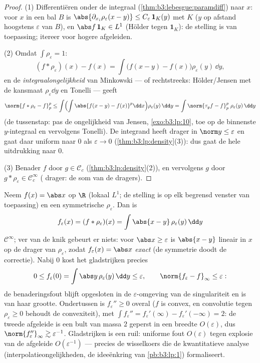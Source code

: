 \begin{proof}
(1) Differentiëren onder de integraal
(\cref{thm:b3:lebesgue:paramdiff}) naar $x$: voor $x$ in een bal
$B$ is $\abs{\partial_{x_i}\rho_\varepsilon(x - y)} \leq
C_\varepsilon\,\mathbf 1_{K}(y)$ met $K$  ($y$ op afstand
hoogstens $\varepsilon$ van $B$), en $\abs f\,\mathbf 1_K \in
L^1$ (Hölder tegen $\mathbf 1_K$): de stelling is van
toepassing; itereer voor hogere afgeleiden.

(2) Omdat $\int\rho_\varepsilon = 1$:
\[
(f * \rho_\varepsilon)(x) - f(x)
= \int \bigl(f(x - y) - f(x)\bigr)\rho_\varepsilon(y)\,\dd y ,
\]
en de \emph{integraalongelijkheid} van Minkowski --- of
rechtstreeks: Hölder/Jensen met de kansmaat
$\rho_\varepsilon\dd y$ en Tonelli --- geeft
\[
\norm{f*\rho_\varepsilon - f}_p^p
\leq \int\Bigl(\int\abs{f(x-y) -
f(x)}^p\dd x\Bigr)\rho_\varepsilon(y)\,\dd y
= \int \norm{\tau_yf - f}_p^p\;\rho_\varepsilon(y)\,\dd y
\]
(de tussenstap: pas de ongelijkheid van Jensen,
\cref{exo:b3:lp:10}, toe op de binnenste $y$-integraal en
vervolgens Tonelli). De integrand heeft drager in $\norm y \leq
\varepsilon$ en gaat daar uniform naar $0$ als $\varepsilon \to
0$ (\cref{thm:b3:lp:density}(3)): dus gaat de hele uitdrukking
naar $0$.

(3) Benader $f$ door $g \in \mathcal C_c$
(\cref{thm:b3:lp:density}(2)), en vervolgens $g$ door $g *
\rho_\varepsilon \in \mathcal C_c^\infty$ ( drager: de
som van de dragers).
\end{proof}

\begin{example}
\label{ex:b3:lp:mollifyexample}
Neem $f(x) = \abs x$ op $\R$ (lokaal $L^1$; de stelling is op elk
begrensd venster van toepassing) en een symmetrische 
$\rho_\varepsilon$. Dan is
\[
f_\varepsilon(x) = (f * \rho_\varepsilon)(x)
= \int\abs{x - y}\,\rho_\varepsilon(y)\,\dd y
\]
$\mathcal C^\infty$; ver van de knik gebeurt er niets: voor
$\abs x \geq \varepsilon$ is $\abs{x - y}$ lineair in $x$ op de
drager van $\rho_\varepsilon$, zodat $f_\varepsilon(x) = \abs x$
\emph{exact} (de symmetrie doodt de correctie). Nabij $0$ kost
het gladstrijken precies
\[
0 \leq f_\varepsilon(0) = \int\abs
y\,\rho_\varepsilon(y)\,\dd y \leq \varepsilon,
\qquad
\norm{f_\varepsilon - f}_\infty \leq \varepsilon :
\]
de benaderingsfout blijft opgesloten in de
$\varepsilon$-omgeving van de singulariteit en is van haar
grootte. Ondertussen is $f_\varepsilon'' \geq 0$ overal ($f$ is
convex, en convolutie tegen $\rho_\varepsilon \geq 0$ behoudt de
convexiteit), met $\int f_\varepsilon'' = f_\varepsilon'(\infty)
- f_\varepsilon'(-\infty) = 2$: de tweede afgeleide is een bult
van massa $2$ geperst in een breedte $O(\varepsilon)$, dus
$\norm{f_\varepsilon''}_\infty \gtrsim \varepsilon^{-1}$.
Gladstrijken is een ruil: uniforme fout $O(\varepsilon)$ tegen
explosie van de afgeleide $O(\varepsilon^{-1})$ --- precies de
wisselkoers die de kwantitatieve analyse
(interpolatieongelijkheden, de ideeënkring van
\cref{pb:b3:lp:1}) formaliseert.
\end{example}

